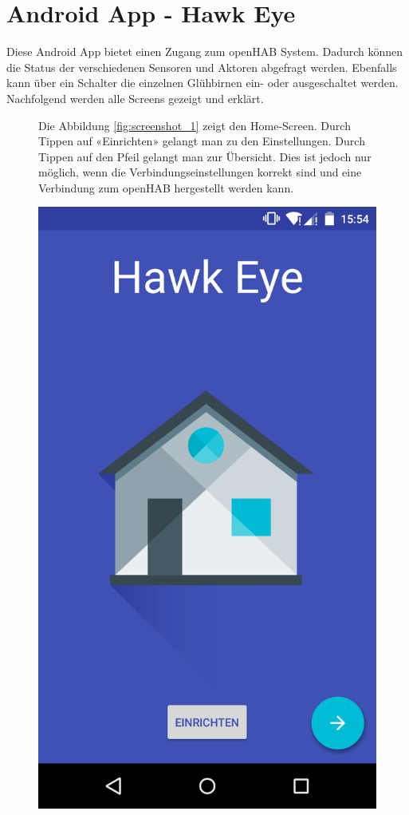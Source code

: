 \pagebreak
\section*{Android App - Hawk Eye}
\label{sec:manualAndroidApp}
Diese Android App bietet einen Zugang zum openHAB System. Dadurch können die Status der verschiedenen Sensoren und Aktoren abgefragt werden. Ebenfalls kann über ein Schalter die einzelnen Glühbirnen ein- oder ausgeschaltet werden. Nachfolgend werden alle Screens gezeigt und erklärt.

\begin{figure}[htbp]
	\begin{minipage}{0.6\textwidth} 
Die Abbildung \ref{fig:screenshot_1} zeigt den Home-Screen. Durch Tippen auf «Einrichten» gelangt man zu den Einstellungen. Durch Tippen auf den Pfeil gelangt man zur Übersicht. Dies ist jedoch nur möglich, wenn die Verbindungseinstellungen korrekt sind und eine Verbindung zum openHAB hergestellt werden kann.
	\end{minipage}
	\hfill
	\begin{minipage}{0.32\textwidth}
		\includegraphics[scale=0.12]{appendix/img/AppScreenshots/Screenshot1}

\end{minipage}
\end{figure}
